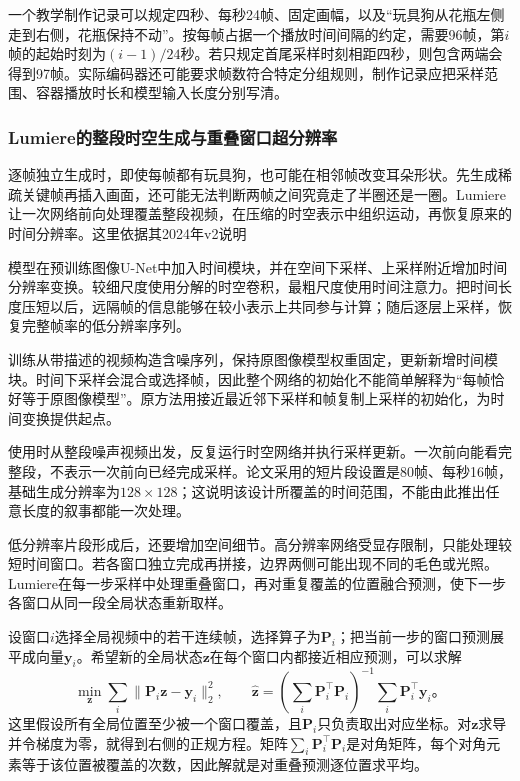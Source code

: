 一个教学制作记录可以规定四秒、每秒24帧、固定画幅，以及“玩具狗从花瓶左侧走到右侧，花瓶保持不动”。按每帧占据一个播放时间间隔的约定，需要96帧，第$i$帧的起始时刻为$(i-1)/24$秒。若只规定首尾采样时刻相距四秒，则包含两端会得到97帧。实际编码器还可能要求帧数符合特定分组规则，制作记录应把采样范围、容器播放时长和模型输入长度分别写清。

\subsubsection{Lumiere的整段时空生成与重叠窗口超分辨率}
\label{sec:vision-multigen-lumiere}

逐帧独立生成时，即使每帧都有玩具狗，也可能在相邻帧改变耳朵形状。先生成稀疏关键帧再插入画面，还可能无法判断两帧之间究竟走了半圈还是一圈。Lumiere让一次网络前向处理覆盖整段视频，在压缩的时空表示中组织运动，再恢复原来的时间分辨率。这里依据其2024年v2说明

模型在预训练图像U-Net中加入时间模块，并在空间下采样、上采样附近增加时间分辨率变换。较细尺度使用分解的时空卷积，最粗尺度使用时间注意力。把时间长度压短以后，远隔帧的信息能够在较小表示上共同参与计算；随后逐层上采样，恢复完整帧率的低分辨率序列。

训练从带描述的视频构造含噪序列，保持原图像模型权重固定，更新新增时间模块。时间下采样会混合或选择帧，因此整个网络的初始化不能简单解释为“每帧恰好等于原图像模型”。原方法用接近最近邻下采样和帧复制上采样的初始化，为时间变换提供起点。

使用时从整段噪声视频出发，反复运行时空网络并执行采样更新。一次前向能看完整段，不表示一次前向已经完成采样。论文采用的短片段设置是80帧、每秒16帧，基础生成分辨率为$128\times128$；这说明该设计所覆盖的时间范围，不能由此推出任意长度的叙事都能一次处理。

低分辨率片段形成后，还要增加空间细节。高分辨率网络受显存限制，只能处理较短时间窗口。若各窗口独立完成再拼接，边界两侧可能出现不同的毛色或光照。Lumiere在每一步采样中处理重叠窗口，再对重复覆盖的位置融合预测，使下一步各窗口从同一段全局状态重新取样。

设窗口$i$选择全局视频中的若干连续帧，选择算子为$\bm P_i$；把当前一步的窗口预测展平成向量$\bm y_i$。希望新的全局状态$\bm z$在每个窗口内都接近相应预测，可以求解
\begin{equation}
  \min_{\bm z}\sum_i\lVert\bm P_i\bm z-\bm y_i\rVert_2^2,
  \qquad
  \widehat{\bm z}
  =\left(\sum_i\bm P_i^\top\bm P_i\right)^{-1}
     \sum_i\bm P_i^\top\bm y_i\text{。}
  \label{eq:vision-window-consensus}
\end{equation}
这里假设所有全局位置至少被一个窗口覆盖，且$\bm P_i$只负责取出对应坐标。对$\bm z$求导并令梯度为零，就得到右侧的正规方程。矩阵$\sum_i\bm P_i^\top\bm P_i$是对角矩阵，每个对角元素等于该位置被覆盖的次数，因此解就是对重叠预测逐位置求平均。

